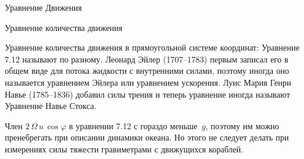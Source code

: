 \begin{chapter}{Уравнение Движения}
\begin{section}{Уравнение количества движения}
\begin{paragraph}{Уравнение количества движения в прямоугольной системе координат:}
Уравнение 7.12 называют по разному. Леонард Эйлер (1707--1783) первым
записал его в общем виде для потока жидкости с внутренними силами,
поэтому иногда оно называется уравнением Эйлера или уравнением
ускорения. Луис Мария Генри Навье (1785--1836) добавил силы трения и
теперь уравнение иногда называют Уравнение Навье Стокса.
%

Член $2\,\Omega\,u\, \cos{\varphi}$ в уравнении 7.12 с гораздо
меньше~$g$, поэтому им можно пренебрегать при описании динамики
океана. Но этого не следует делать при измерениях силы тяжести
гравиметрами с движущихся кораблей.
%
%
\end{paragraph}



\end{section}
\end{chapter}
